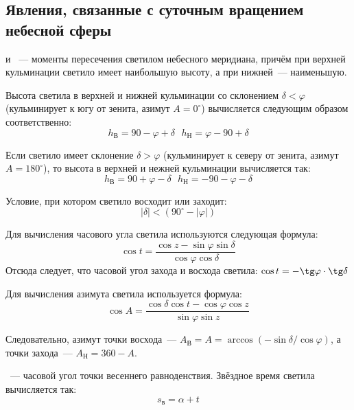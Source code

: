 \subsection{Явления, связанные с суточным вращением небесной сферы}
 и ~--- моменты пересечения светилом небесного меридиана, причём при верхней кульминации светило имеет наибольшую высоту, а при нижней~--- наименьшую.

Высота светила в верхней и нижней кульминации со склонением $\delta<\varphi$ (кульминирует к югу от зенита, азимут $A=0^{\circ}$) вычисляется следующим образом соответственно:
\begin{equation}
h_{\text{В}}= 90-\varphi+\delta\text{   }
h_{\text{Н}}= \varphi-90+\delta
\end{equation}

Если светило имеет склонение $\delta>\varphi$ (кульминирует к северу от зенита, азимут $A=180^{\circ}$), то высота в верхней и нежней кульминации вычисляется так:
\begin{equation}
h_{\text{В}}= 90+\varphi-\delta\text{   }
h_{\text{Н}}= -90-\varphi-\delta
\end{equation}

Условие, при котором светило восходит или заходит:
\begin{equation}
|\delta|<(90^{\circ}-|\varphi|)
\end{equation}

Для вычисления часового угла светила используются следующая формула:
\begin{equation}
\cos t=\frac{\cos z-\sin\varphi\sin\delta}{\cos\varphi\cos\delta}
\end{equation}
Отсюда следует, что часовой угол захода и восхода светила: $\cos t=-\tg\varphi\cdot\tg\delta$

Для вычисления азимута светила используется формула:
\begin{equation}
\cos A=\frac{\cos\delta\cos t-\cos\varphi\cos z}{\sin\varphi\sin z}
\end{equation}

Следовательно, азимут точки восхода~--- $A_{\text{В}}=A=\arccos(-\sin\delta/\cos \varphi)$, а точки захода~--- $A_{\text{Н}}=360-A$.

~--- часовой угол точки весеннего равноденствия. Звёздное время светила вычисляется так:
\begin{equation}
s_{\text{в}}=\alpha+t
\end{equation}